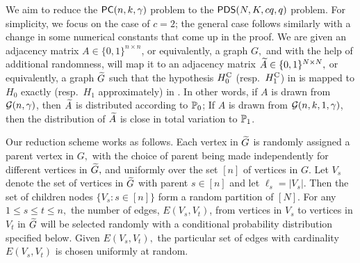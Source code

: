 	
We aim to reduce the ${\sf PC}(n,k,\gamma)$ problem to the ${\sf PDS}(N,K,cq,q)$ problem.
For simplicity, we focus on the case of $c=2$; the general case follows similarly with a change
in some numerical constants that come up in the proof.
We are given an adjacency matrix $A \in \{0,1\}^{n \times n}$, or equivalently, a graph $G,$  and with the help of additional
randomness, will map it to an adjacency matrix ${\widetilde{A}} \in \{0,1\}^{N \times N},$ or equivalently, a graph ${\widetilde{G}}$
such that the hypothesis $H_0^{\rm C}$ (resp.\ $H_1^{\rm C}$) in  is mapped to $H_0$ exactly (resp.\ $H_1$ approximately) in . In other words, if $A$ is drawn from ${\mathcal{G}}(n,\gamma)$, then ${\widetilde{A}}$ is distributed according to $\mathbb{P}_0$; If $A$ is drawn from ${\mathcal{G}}(n,k,1,\gamma)$, then the distribution of ${\widetilde{A}}$ is close in total variation to $\mathbb{P}_1$.

Our reduction scheme works as follows. Each vertex in ${\widetilde{G}}$ is randomly assigned a parent vertex in $G,$
with the choice of parent being made independently for different vertices in ${\widetilde{G}},$  and uniformly
over the set $[n]$ of vertices in $G.$  Let $V_s$ denote the set of vertices in ${\widetilde{G}}$ with parent
$s\in [n]$  and let $\ell_s=|V_s|$. Then the set of children nodes $\{V_s: s \in [n]\}$ form a random partition of $[N]$.
For any $1 \leq s \leq t \leq n,$ the number of edges, $E(V_s,V_t)$, from vertices in $V_s$ to vertices in $V_t$
in ${\widetilde{G}}$ will be selected randomly with a conditional probability distribution specified below.
Given  $E(V_s,V_t),$  the particular  set of edges with cardinality $E(V_s,V_t)$ is chosen uniformly at
random.
	
